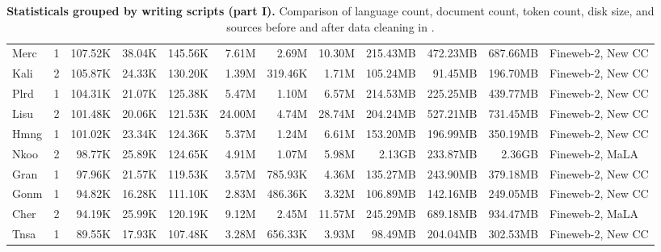 \begin{table*}[!htp]
{\begin{tabular}{l|c|rrr|rrr|rrr|l}
Merc                    & 1                        & 107.52K  & 38.04K   & 145.56K & 7.61M   & 2.69M   & 10.30M  & 215.43MB & 472.23MB & 687.66MB & Fineweb-2, New CC              \\
Kali                    & 2                        & 105.87K  & 24.33K   & 130.20K & 1.39M   & 319.46K & 1.71M   & 105.24MB & 91.45MB  & 196.70MB & Fineweb-2, New CC              \\
Plrd                    & 1                        & 104.31K  & 21.07K   & 125.38K & 5.47M   & 1.10M   & 6.57M   & 214.53MB & 225.25MB & 439.77MB & Fineweb-2, New CC              \\
Lisu                    & 2                        & 101.48K  & 20.06K   & 121.53K & 24.00M  & 4.74M   & 28.74M  & 204.24MB & 527.21MB & 731.45MB & Fineweb-2, New CC              \\
Hmng                    & 1                        & 101.02K  & 23.34K   & 124.36K & 5.37M   & 1.24M   & 6.61M   & 153.20MB & 196.99MB & 350.19MB & Fineweb-2, New CC              \\
Nkoo                    & 2                        & 98.77K   & 25.89K   & 124.65K & 4.91M   & 1.07M   & 5.98M   & 2.13GB   & 233.87MB & 2.36GB   & Fineweb-2, MaLA                \\
Gran                    & 1                        & 97.96K   & 21.57K   & 119.53K & 3.57M   & 785.93K & 4.36M   & 135.27MB & 243.90MB & 379.18MB & Fineweb-2, New CC              \\
Gonm                    & 1                        & 94.82K   & 16.28K   & 111.10K & 2.83M   & 486.36K & 3.32M   & 106.89MB & 142.16MB & 249.05MB & Fineweb-2, New CC              \\
Cher                    & 2                        & 94.19K   & 25.99K   & 120.19K & 9.12M   & 2.45M   & 11.57M  & 245.29MB & 689.18MB & 934.47MB & Fineweb-2, MaLA                \\
Tnsa                    & 1                        & 89.55K   & 17.93K   & 107.48K & 3.28M   & 656.33K & 3.93M   & 98.49MB  & 204.04MB & 302.53MB & Fineweb-2, New CC              \\
\bottomrule
\end{tabular}
}
\caption{
\label{tab:app_script_1}
\textbf{Statisticals grouped by writing scripts (part I).}
Comparison of language count, document count, token count, disk size,  and sources before and after data cleaning in \dcad.
}
\end{table*}


